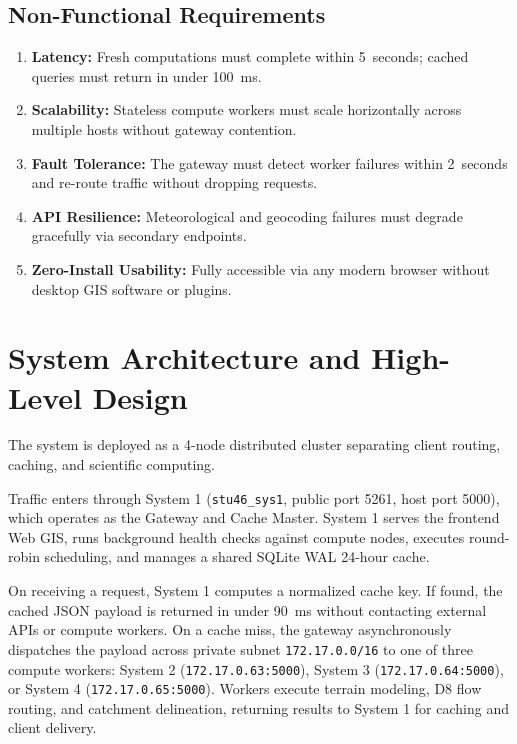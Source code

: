 \documentclass[manuscript,screen,review]{acmart}
\begin{document}
\subsection{Non-Functional Requirements}
\begin{enumerate}
    \item \textbf{Latency:} Fresh computations must complete within 5~seconds; cached queries must return in under 100~ms.
    \item \textbf{Scalability:} Stateless compute workers must scale horizontally across multiple hosts without gateway contention.
    \item \textbf{Fault Tolerance:} The gateway must detect worker failures within 2~seconds and re-route traffic without dropping requests.
    \item \textbf{API Resilience:} Meteorological and geocoding failures must degrade gracefully via secondary endpoints.
    \item \textbf{Zero-Install Usability:} Fully accessible via any modern browser without desktop GIS software or plugins.
\end{enumerate}

\section{System Architecture and High-Level Design}
\label{sec:architecture}

The system is deployed as a 4-node distributed cluster separating client routing, caching, and scientific computing.

Traffic enters through System 1 (\texttt{stu46\_sys1}, public port 5261, host port 5000), which operates as the Gateway and Cache Master. System 1 serves the frontend Web GIS, runs background health checks against compute nodes, executes round-robin scheduling, and manages a shared SQLite WAL 24-hour cache. 

On receiving a request, System 1 computes a normalized cache key. If found, the cached JSON payload is returned in under 90~ms without contacting external APIs or compute workers. On a cache miss, the gateway asynchronously dispatches the payload across private subnet \texttt{172.17.0.0/16} to one of three compute workers: System 2 (\texttt{172.17.0.63:5000}), System 3 (\texttt{172.17.0.64:5000}), or System 4 (\texttt{172.17.0.65:5000}). Workers execute terrain modeling, D8 flow routing, and catchment delineation, returning results to System 1 for caching and client delivery.
\end{document}
